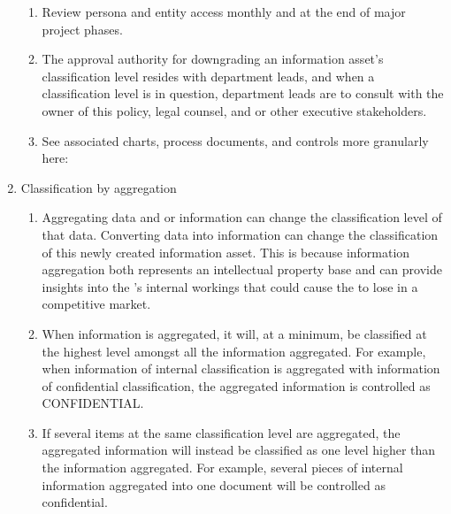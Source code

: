 \documentclass[../main.tex]{subfiles}
\begin{document}
\begin{enumerate}
\begin{enumerate}
        \item Review persona and entity access monthly and at the end of major project phases.
        \item The approval authority for downgrading an information asset's classification level resides with department leads, and when a classification level is in question, department leads are to consult with the owner of this policy, legal counsel, and or other executive stakeholders.
        \item See associated charts, process documents, and controls more granularly here: \InfoInventory
    \end{enumerate}
    \item Classification by aggregation
    \begin{enumerate}
        \item Aggregating data and or information can change the classification level of that data. Converting data into information can change the classification of this newly created information asset. This is because information aggregation both represents an intellectual property base and can provide insights into the \CompanyName’s internal workings that could cause the \CompanyName to lose in a competitive market.
        \item When information is aggregated, it will, at a minimum, be classified at the highest level amongst all the information aggregated. For example, when information of internal classification is aggregated with information of confidential classification, the aggregated information is controlled as CONFIDENTIAL.
        \item If several items at the same classification level are aggregated, the aggregated information will instead be classified as one level higher than the information aggregated. For example, several pieces of internal information aggregated into one document will be controlled as confidential.
    \end{enumerate}
\end{enumerate}
\end{document}
